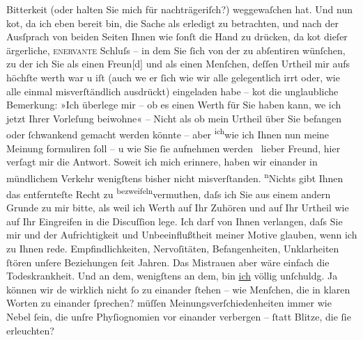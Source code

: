                Bitterkeit (oder halten Sie mich für nachträgeriſch?) weggewaſchen hat. Und nun ko{\geminationm}t, da ich eben bereit bin, die Sache als erledigt zu
               betrachten, und nach der Ausſprach von beiden Seiten {\pb}Ihnen wie ſonſt die Hand zu drücken, da ko{\geminationm}t dieſer ärgerliche, \textsc{enervante} Schluſs – in dem Sie ſich von der \label{K_L02989-2v}\label{K_L02989-2} zu abſentiren wünſchen, zu der ich Sie als einen Freun{[}d{]}
               und als einen Menſchen, deſſen Urtheil mir aufs höchſte werth war u iſt (auch we{\geminationn} er ſich wie wir alle {\pb}gelegentlich irrt oder, wie alle einmal
               misverſtändlich ausdrückt) eingeladen habe – ko{\geminationm}t die
               unglaubliche Bemerkung: »Ich überlege mir – ob es einen Werth für Sie haben kann,
                  we{\geminationn} ich jetzt Ihrer Vorleſung beiwohne{\dotstwo}« – Nicht als ob mein Urtheil über Sie befangen oder
               ſchwankend gemacht werden könnte – aber \substVorne{}\textsuperscript{ich}\substDazwischen{}wie\substHinten{} ich Ihnen nun meine {\pb}Meinung
               formuliren ſoll – u wie Sie ſie aufnehmen werden {\dotsfive} lieber Freund, hier verſagt mir die Antwort. Soweit ich
               mich erinnere, haben wir einander in mündlichem Verkehr wenigſtens bisher nicht
               misverſtanden. \substVorne{}\textsuperscript{n}\substDazwischen{}N\substHinten{}ichts gibt Ihnen das
               entfernteſte Recht zu \substVorne{}\textsuperscript{bezweifeln}\substDazwischen{}vermuthen\substHinten{}, daſs ich Sie aus einem andern {\pb}Grunde zu mir bitte, als weil ich Werth auf Ihr Zuhören und auf Ihr Urtheil wie auf
               Ihr Eingreifen in die Discuſſion lege. Ich darf von Ihnen verlangen, daſs Sie mir und
               der Aufrichtigkeit \introOben{}und Unbeeinflußtheit\introOben{} meiner Motive
               glauben, wenn ich zu Ihnen rede. Empfindlichkeiten, Nervoſitäten, Befan{\pb}genheiten, Unklarheiten ſtören unſere
               Beziehungen ſeit Jahren. Das Mistrauen aber wäre einfach die Todeskrankheit. Und an
               dem, wenigſtens an dem, bin \uline{ich} völlig unſchuldg. Ja
               können wir de{\geminationn} wirklich nicht ſo zu einander ſtehen –
               wie Menſchen, die in klaren Worten zu einander ſprechen? {\pb}müſſen Meinungsverſchiedenheiten immer wie
               Nebel ſein, die unſre Phyſiognomien vor einander verbergen – ſtatt Blitze, die ſie
               erleuchten?\pend
           
